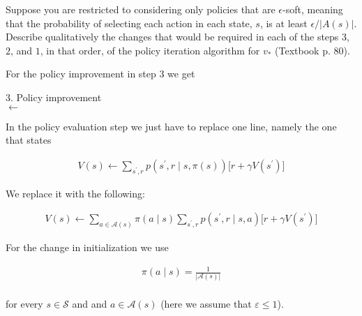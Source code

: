 \begin{exercise}
Suppose you are restricted to considering only policies that are $\epsilon$-soft, meaning that the probability of selecting each action in each state, $s$, is at least $\epsilon / |A(s)|$.
Describe qualitatively the changes that would be required in each of the steps $3$, $2$, and $1$, in that order, of the policy iteration algorithm for $v_\ast$ (Textbook p. 80).
\end{exercise}

\begin{solution}
  For the policy improvement in step 3 we get
  \newline

  \begin{algorithm}[H]

  {3. Policy improvement} \\
  {\Policy $\leftarrow$ \True}\;
 \caption{Policy improvement with an $\varepsilon$-soft policy}
  \end{algorithm}

  In the policy evaluation step we just have to replace one line, namely the one that states

  \begin{align*}
    V(s) \leftarrow  \sum_{s^\prime, r} p(s^\prime, r\mid s, \pi(s))\big[r + \gamma V(s^\prime)\big]
  \end{align*}

  We replace it with the following:

  \begin{align*}
    V(s) \leftarrow \sum_{a \in \mathcal A(s)} \pi(a\mid s)\sum_{s^\prime, r} p(s^\prime, r\mid s, a)\big[r + \gamma V(s^\prime)\big]
  \end{align*}

  For the change in initialization we use

  \begin{align*}
     \pi(a\mid s) = \frac{1}{|\mathcal{A}(s)|} \\
  \end{align*}

  for every $s \in \mathcal S$ and and $a \in \mathcal A(s)$ (here we assume that $\varepsilon \leq 1$).
\end{solution}
